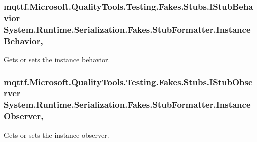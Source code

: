 \hypertarget{class_system_1_1_runtime_1_1_serialization_1_1_fakes_1_1_stub_formatter_a44bd108c1207aea98e8680341d9a414b}{
\subsubsection[{Instance\-Behavior}]{\setlength{\rightskip}{0pt plus 5cm}mqttf.\-Microsoft.\-Quality\-Tools.\-Testing.\-Fakes.\-Stubs.\-I\-Stub\-Behavior System.\-Runtime.\-Serialization.\-Fakes.\-Stub\-Formatter.\-Instance\-Behavior\hspace{0.3cm}{\ttfamily [get]}, {\ttfamily [set]}}}\label{class_system_1_1_runtime_1_1_serialization_1_1_fakes_1_1_stub_formatter_a44bd108c1207aea98e8680341d9a414b}


Gets or sets the instance behavior.

\hypertarget{class_system_1_1_runtime_1_1_serialization_1_1_fakes_1_1_stub_formatter_ab3cde98253f575cbfca6ca04e7c4bd30}{
\subsubsection[{Instance\-Observer}]{\setlength{\rightskip}{0pt plus 5cm}mqttf.\-Microsoft.\-Quality\-Tools.\-Testing.\-Fakes.\-Stubs.\-I\-Stub\-Observer System.\-Runtime.\-Serialization.\-Fakes.\-Stub\-Formatter.\-Instance\-Observer\hspace{0.3cm}{\ttfamily [get]}, {\ttfamily [set]}}}\label{class_system_1_1_runtime_1_1_serialization_1_1_fakes_1_1_stub_formatter_ab3cde98253f575cbfca6ca04e7c4bd30}


Gets or sets the instance observer.

